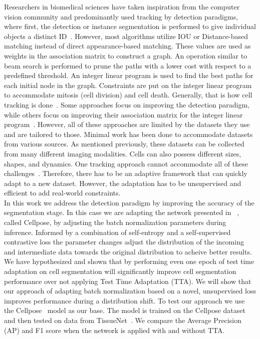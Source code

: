Researchers in biomedical sciences have taken inspiration from the computer vision community and predominantly used tracking by detection paradigms, where first, the detection or instance segmentation is performed to give individual objects a distinct ID~\cite{bragantini2024ultrack,ershov2022trackmate}. However, most algorithms utilize IOU or Distance-based matching instead of direct appearance-based matching. These values are used as weights in the association matrix to construct a graph. An operation similar to beam search is performed to prune the paths with a lower cost with respect to a predefined threshold.  An integer linear program is used to find the best paths for each initial node in the graph. Constraints are put on the integer linear program to accommodate mitosis (cell division) and cell death. Generally, that is how cell tracking is done~\cite{mavska2023cell}. Some approaches focus on improving the detection paradigm, while others focus on improving their association matrix for the integer linear program~\cite{mavska2023cell}. However, all of these approaches are limited by the datasets they use and are tailored to those. Minimal work has been done to accommodate datasets from various sources. As mentioned previously, these datasets can be collected from many different imaging modalities. Cells can also possess different sizes, shapes, and dynamics. One tracking approach cannot accommodate all of these challenges~\cite{chen2024cmtt}. Therefore, there has to be an adaptive framework that can quickly adapt to a new dataset. However, the adaptation has to be unsupervised and efficient to add real-world constraints.\\

In this work we address the detection paradigm by improving the accuracy of the segmentation stage.  In this case we are adapting the network presented in ~\cite{stringer2021cellpose}, called Cellpose, by adjusting the batch normalization parameters during inference.  Informed by a combination of self-entropy and a self-supervised contrastive loss the parameter changes adjust the distribution of the incoming and intermediate data towards the original distribution to acheive better results. We have hypothesized and shown that by performing even one epoch of test time adaptation on cell segmentation will significantly improve cell segmentation performance over not applying Test Time Adaptation (TTA). We will show that our approach of adapting batch normalization based on a novel, unsupervised loss improves performance during a distribution shift. To test our approach we use the Cellpose~\cite{keaton2023celltranspose} model as our base. The model is trained on the Cellpose dataset~\cite{stringer2021cellpose} and then tested on data from TissueNet~\cite{TissueNet,TN2,TN3,TN4}. We compare the Average Precision (AP) and F1 score when the network is applied with and without TTA. 


